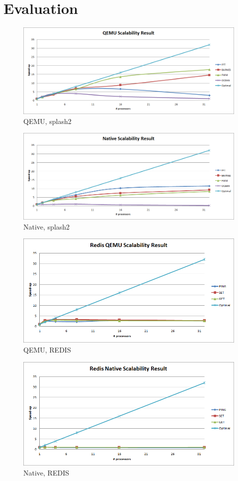 \section{Evaluation}

\begin{figure}[H]
\center
\includegraphics[width=0.8\linewidth]{figures/qm_splash2.png}
\caption{QEMU, splash2}
\label{fig:splash2_vm}
\end{figure}

\begin{figure}[H]
\center
\includegraphics[width=0.8\linewidth]{figures/native_splash2.png}
\caption{Native, splash2}
\label{fig:splash2_native}
\end{figure}

\begin{figure}[H]
\center
\includegraphics[width=0.8\linewidth]{figures/redis_qemu.png}
\caption{QEMU, REDIS}
\label{fig:redis_vm}
\end{figure}

\begin{figure}[H]
\center
\includegraphics[width=0.8\linewidth]{figures/redis_native.png}
\caption{Native, REDIS}
\label{fig:redis_native}
\end{figure}


